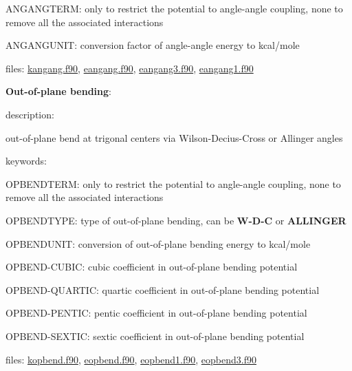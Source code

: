 \begin{DoxyItemize}
\begin{DoxyItemize}
\begin{DoxyItemize}
\item A\-N\-G\-A\-N\-G\-T\-E\-R\-M\-: only to restrict the potential to angle-\/angle coupling, none to remove all the associated interactions
\item A\-N\-G\-A\-N\-G\-U\-N\-I\-T\-: conversion factor of angle-\/angle energy to kcal/mole
\end{DoxyItemize}
\item files\-: \hyperlink{kangang_8f90}{kangang.\-f90}, \hyperlink{eangang_8f90}{eangang.\-f90}, \hyperlink{eangang3_8f90}{eangang3.\-f90}, \hyperlink{eangang1_8f90}{eangang1.\-f90}
\end{DoxyItemize}
\item {\bfseries Out-\/of-\/plane bending}\-:
\begin{DoxyItemize}
\item description\-:
\begin{DoxyItemize}
\item out-\/of-\/plane bend at trigonal centers via Wilson-\/\-Decius-\/\-Cross or Allinger angles
\end{DoxyItemize}
\item keywords\-:
\begin{DoxyItemize}
\item O\-P\-B\-E\-N\-D\-T\-E\-R\-M\-: only to restrict the potential to angle-\/angle coupling, none to remove all the associated interactions
\item O\-P\-B\-E\-N\-D\-T\-Y\-P\-E\-: type of out-\/of-\/plane bending, can be {\bfseries W-\/\-D-\/\-C} or {\bfseries A\-L\-L\-I\-N\-G\-E\-R}
\item O\-P\-B\-E\-N\-D\-U\-N\-I\-T\-: conversion of out-\/of-\/plane bending energy to kcal/mole
\item O\-P\-B\-E\-N\-D-\/\-C\-U\-B\-I\-C\-: cubic coefficient in out-\/of-\/plane bending potential
\item O\-P\-B\-E\-N\-D-\/\-Q\-U\-A\-R\-T\-I\-C\-: quartic coefficient in out-\/of-\/plane bending potential
\item O\-P\-B\-E\-N\-D-\/\-P\-E\-N\-T\-I\-C\-: pentic coefficient in out-\/of-\/plane bending potential
\item O\-P\-B\-E\-N\-D-\/\-S\-E\-X\-T\-I\-C\-: sextic coefficient in out-\/of-\/plane bending potential
\end{DoxyItemize}
\item files\-: \hyperlink{kopbend_8f90}{kopbend.\-f90}, \hyperlink{eopbend_8f90}{eopbend.\-f90}, \hyperlink{eopbend1_8f90}{eopbend1.\-f90}, \hyperlink{eopbend3_8f90}{eopbend3.\-f90}
\end{DoxyItemize}

\end{DoxyItemize}
